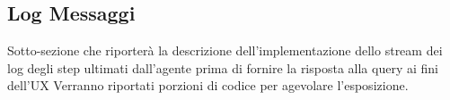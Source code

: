 \subsection{Log Messaggi}

Sotto-sezione che riporterà la descrizione dell'implementazione dello stream dei log degli step ultimati dall'agente prima di fornire la risposta alla query ai fini dell'UX
Verranno riportati porzioni di codice per agevolare l'esposizione.
